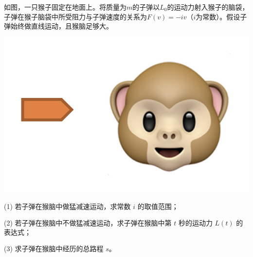 \documentclass[UTF8,12pt,oneside]{ctexart}
\begin{document}
如图，一只猴子固定在地面上。将质量为$m$的子弹以$L_0$的运动力射入猴子的脑袋，子弹在猴子脑袋中所受阻力与子弹速度的关系为$F(v)=-iv$（$i$为常数）。假设子弹始终做直线运动，且猴脑足够大。

\begin{center}
\includegraphics[scale=0.15]{fig1.jpg}
\end{center}

(1) 若子弹在猴脑中做猛减速运动，求常数 $i$ 的取值范围；

(2) 若子弹在猴脑中不做猛减速运动，求子弹在猴脑中第 $t$ 秒的运动力 $L(t)$ 的表达式；

(3) 求子弹在猴脑中经历的总路程 $s$。
\end{document}
